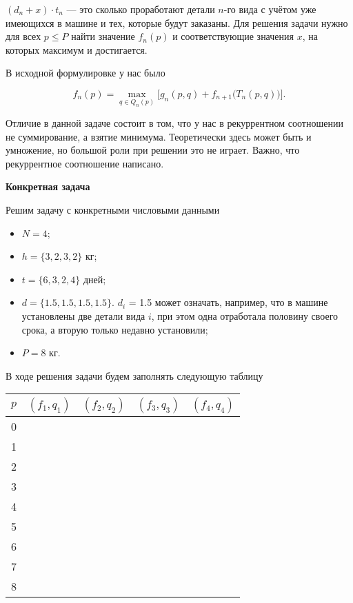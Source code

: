 $(d_n + x) \cdot t_n$ --- это сколько проработают детали $n$-го вида с учётом уже имеющихся в машине и тех, которые будут заказаны. Для решения задачи нужно для всех $p \le P$ найти значение $f_n(p)$ и соответствующие значения $x$, на которых максимум и достигается.

В исходной формулировке у нас было

\[
f_n(p) = \max_{q \in Q_{n}(p)} \Big[g_n(p, q) + f_{n+1}\big(T_{n}(p, q)\big)\Big].
\]

Отличие в данной задаче состоит в том, что у нас в рекуррентном соотношении не суммирование, а взятие минимума. Теоретически здесь может быть и умножение, но большой роли при решении это не играет. Важно, что рекуррентное соотношение написано.

\bigskip

\textbf{Конкретная задача}

Решим задачу с конкретными числовыми данными

\begin{itemize}[nosep]
	\item $N = 4$;
	
	\item $h = \{3, 2, 3, 2\}$ кг;
	
	\item $t = \{6, 3, 2, 4\}$ дней;
	
	\item $d = \{1.5, 1.5, 1.5, 1.5\}$. $d_i$ = 1.5 может означать, например, что в машине установлены две детали вида $i$, при этом одна отработала половину своего срока, а вторую только недавно установили;
	
	\item $P = 8$ кг.
\end{itemize}

\bigskip

В ходе решения задачи будем заполнять следующую таблицу

\begin{table}[H]
	\centering
	\begin{tabular}{ | c | c | c | c | c | } 
		\hline
		$p$ & $(f_1, q_1)$ & $(f_2, q_2)$ & $(f_3, q_3)$ & $(f_4, q_4)$ \\ 
		\hline
		0 & & & & \\\hline
		1 & & & & \\\hline
		2 & & & &\\\hline
		3 & & & & \\\hline
		4 & & & & \\\hline
		5 & & & & \\\hline
		6 & & & & \\\hline
		7 & & & & \\\hline
		8 & & & & \\\hline
	\end{tabular}
\end{table}

